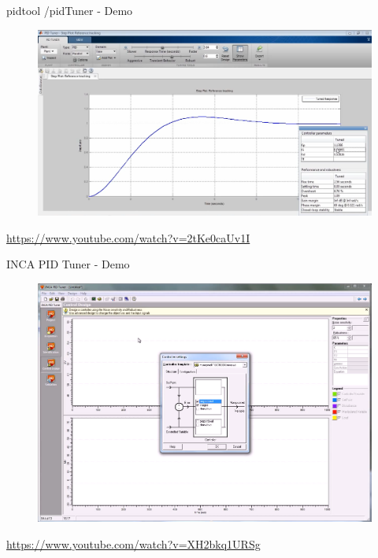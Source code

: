 \begin{frame}{pidtool /pidTuner - Demo}
	\begin{figure}
		\centering
		\includegraphics[width=0.7\linewidth]{img/pid_tool}
	\end{figure}
	\url{https://www.youtube.com/watch?v=2tKe0caUv1I}
\end{frame}

\begin{frame}{INCA PID Tuner - Demo}
	\begin{figure}
		\centering
		\includegraphics[width=0.7\linewidth]{img/inca_tunner}
	\end{figure}
	\url{https://www.youtube.com/watch?v=XH2bkq1URSg}
\end{frame}